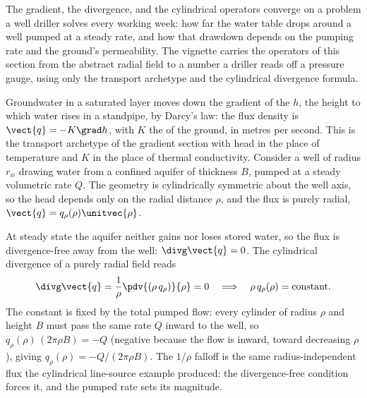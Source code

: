 The gradient, the divergence, and the cylindrical operators converge
on a problem a well driller solves every working week: how far the
water table drops around a well pumped at a steady rate, and how that
drawdown depends on the pumping rate and the ground's permeability.
The vignette carries the operators of this section from the abstract
radial field to a number a driller reads off a pressure gauge, using
only the transport archetype and the cylindrical divergence formula.

Groundwater in a saturated layer moves down the gradient of the
 $h$, the height to which water rises in a
standpipe, by Darcy's law: the flux density is $\vect{q} = -K\grad h$,
with $K$ the  of the ground, in metres
per second. This is the transport archetype of the gradient section
with head in the place of temperature and $K$ in the place of thermal
conductivity. Consider a well of radius $r_{w}$ drawing water from a
confined aquifer of thickness $B$, pumped at a steady volumetric rate
$Q$. The geometry is cylindrically symmetric about the well axis, so
the head depends only on the radial distance $\rho$, and the flux is
purely radial, $\vect{q} = q_{\rho}(\rho)\unitvec{\rho}$.

At steady state the aquifer neither gains nor loses stored water, so
the flux is divergence-free away from the well: $\divg\vect{q} = 0$.
The cylindrical divergence of a purely radial field reads
\[
\divg\vect{q} = \frac{1}{\rho}\pdv{(\rho\,q_{\rho})}{\rho} = 0
\quad\Longrightarrow\quad \rho\,q_{\rho}(\rho) = \text{constant}.
\]
The constant is fixed by the total pumped flow: every cylinder of
radius $\rho$ and height $B$ must pass the same rate $Q$ inward to the
well, so $q_{\rho}(\rho)\,(2\pi\rho B) = -Q$ (negative because the flow
is inward, toward decreasing $\rho$), giving $q_{\rho}(\rho) =
-Q/(2\pi\rho B)$. The $1/\rho$ falloff is the same radius-independent
flux the cylindrical line-source example produced: the divergence-free
condition forces it, and the pumped rate sets its magnitude.

